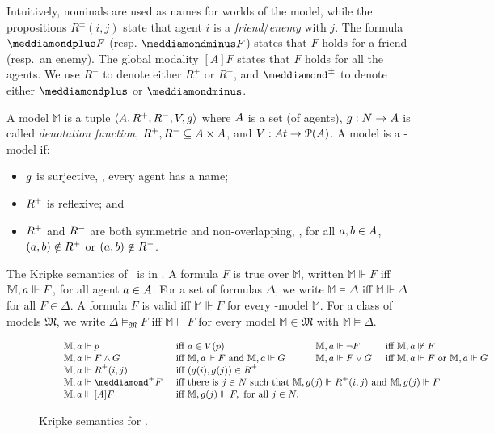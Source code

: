 Intuitively, nominals are used as names for worlds of the model, while the propositions $R^\pm(i,j)$ state that agent $i$ is a  \emph{friend}/\emph{enemy} with
 $j$. 
The formula $\dplus F $ (resp. $\dminus F $) states that $F $ holds for  a friend (resp.\ an enemy). The global
modality $[A]F $ states that $F $ holds for all the agents. 
We use $R^\pm$ to denote either $R^+$ or $R^-$, and 
 $\dplusminus$ to denote either $\dplus$ or $\dminus$. 

A model $\mathbb{M}$ is a tuple $\langle \A,\R^+,\R^-,\V,\g\rangle$ where $\A$
is a set (of agents), $\g:N\rightarrow \A$ is called \emph{denotation
function}, $\R^+,\R^-\subseteq \A\times \A$, and $\V:\At\rightarrow
\mathcal{P}(\A)$. 
%
A model is a \PNL-model if:
\begin{itemize}
\item $\g$ is surjective, \ie, every agent has a name;
\item $\R^+$ is reflexive; and
\item $\R^+$ and $\R^-$ are both symmetric and 
non-overlapping, \ie,  for all $\ag,\b\in \A$, $(\ag,\b)\notin \R^+$ or $(\ag,\b)\notin \R^-$. 
\end{itemize}  
The Kripke semantics of \PNL~is in .
A formula $F$ is true over $\mathbb{M}$, written $\mathbb{M}\Vdash F$ iff
$\mathbb{M},\ag\Vdash F$, for all agent $\ag\in\A$. For a set of formulas
$\Delta$, we write $\mathbb{M}\models \Delta$ iff $\mathbb{M}\Vdash \Delta$ for all $F
\in \Delta$. A formula $F$ is valid iff $\mathbb{M}\Vdash F$ for every
\PNL-model $\mathbb{M}$. For a class of models $\mathfrak{M}$, we write
$\Delta\models_{\mathfrak{M}} F$ iff $\mathbb{M}\Vdash F$ for every model
$\mathbb{M}\in \mathfrak{M}$ with $\mathbb{M}\models \Delta$. 


\begin{figure}
$\small
\qquad\begin{array}{lll l lll}
    \mathbb{M},\ag \Vdash p &\text{ iff } \ag\in \V(p) &\quad& 
    \mathbb{M},\ag \Vdash \neg F &\text{ iff } \mathbb{M},\ag \not \Vdash F\\
    \mathbb{M},\ag \Vdash F \wedge G &\text{ iff } \mathbb{M},\ag \Vdash F \text{ and } \mathbb{M},\ag \Vdash G &\quad&
    \mathbb{M},\ag \Vdash F \vee G &\text{ iff } \mathbb{M},\ag \Vdash F \text{ or } \mathbb{M},\ag \Vdash G\\
    \mathbb{M},\ag \Vdash R^\pm(i,j) &\text{ iff } (\g(i),\g(j))\in \R^\pm\\
    \mathbb{M},\ag \Vdash \dplusminus F &\multicolumn{6}{l}{\text{ iff there is } j\in N \text{ such that } \mathbb{M},\g(j)\Vdash R^{\pm}(i,j)  \text{ and } \mathbb{M},\g(j)\Vdash  F }\\
    \mathbb{M},\ag \Vdash [A] F  &\multicolumn{6}{l}{\text{ iff } \mathbb{M},\g(j)\Vdash  F , \text{ for all } j\in N.}
\end{array}
$
\caption{Kripke semantics for \PNL\label{fig:ksem}.}
\end{figure}


